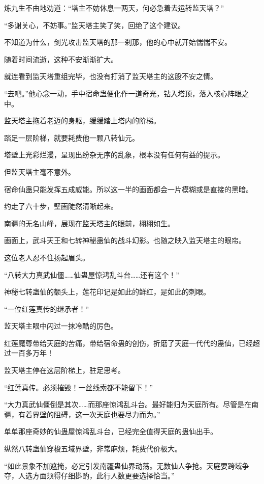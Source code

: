 \begin{this_body}
炼九生不由地劝道：“塔主不妨休息一两天，何必急着去运转监天塔？”

“多谢关心，不妨事。”监天塔主笑了笑，回绝了这个建议。

不知道为什么，剑光攻击监天塔的那一刹那，他的心中就开始惴惴不安。

随着时间流逝，这种不安渐渐扩大。

就连看到监天塔重组完毕，也没有打消了监天塔主的这股不安之情。

“去吧。”他心念一动，手中宿命蛊便化作一道奇光，钻入塔顶，落入核心阵眼之中。

监天塔主拖着老迈的身躯，缓缓踏上塔内的阶梯。

踏足一层阶梯，就要耗费他一颗八转仙元。

塔壁上光彩烂漫，呈现出纷杂无序的乱象，根本没有任何有益的提示。

但监天塔主毫不意外。

宿命仙蛊只能发挥五成威能。所以这一半的画面都会一片模糊或是直接的黑暗。

约走了六十步，壁画陡然清晰起来。

南疆的无名山峰，展现在监天塔主的眼前，栩栩如生。

画面上，武斗天王和七转神秘蛊仙的战斗幻影。也随之映入监天塔主的眼帘。

这位老人忍不住扬起眉头。

“八转大力真武仙僵……仙蛊屋惊鸿乱斗台……还有这个！”

神秘七转蛊仙的额头上，莲花印记是如此的鲜红，是如此的刺眼。

“一位红莲真传的继承者！”

监天塔主眼中闪过一抹冷酷的厉色。

红莲魔尊带给天庭的苦痛，带给宿命蛊的创伤，折磨了天庭一代代的蛊仙，已经超过一百多万年！

监天塔主停在这层阶梯上，驻足思考。

“红莲真传。必须摧毁！一丝线索都不能留下！”

“大力真武仙僵倒是其次……而那座惊鸿乱斗台。最好能归为天庭所有。尽管是在南疆，有着界壁的阻碍，这一次天庭也要尽力而为。”

单单那座奇妙的仙蛊屋惊鸿乱斗台，已经完全值得天庭的蛊仙出手。

纵然八转蛊仙穿梭五域界壁，非常麻烦，耗费代价极大。

“如此景象不加遮掩，必定引发南疆蛊仙界动荡。无数仙人争抢。天庭要跨域争夺，人选方面须得仔细斟酌，此行人数更要选择恰当。”


\end{this_body}
